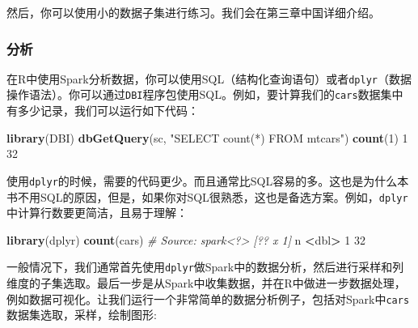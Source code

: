 \documentclass[
]{article}
\newenvironment{Shaded}{\begin{snugshade}}{\end{snugshade}}
\newcommand{\CommentTok}[1]{\textcolor[rgb]{0.56,0.35,0.01}{\textit{#1}}}
\newcommand{\DecValTok}[1]{\textcolor[rgb]{0.00,0.00,0.81}{#1}}
\newcommand{\KeywordTok}[1]{\textcolor[rgb]{0.13,0.29,0.53}{\textbf{#1}}}
\newcommand{\NormalTok}[1]{#1}
\newcommand{\OperatorTok}[1]{\textcolor[rgb]{0.81,0.36,0.00}{\textbf{#1}}}
\newcommand{\StringTok}[1]{\textcolor[rgb]{0.31,0.60,0.02}{#1}}
\begin{document}
然后，你可以使用小的数据子集进行练习。我们会在第三章中国详细介绍。

\hypertarget{ux5206ux6790}{%
\subsubsection{分析}\label{ux5206ux6790}}

在R中使用Spark分析数据，你可以使用SQL（结构化查询语句）或者\texttt{dplyr}（数据操作语法）。你可以通过\texttt{DBI}程序包使用SQL。例如，要计算我们的\texttt{cars}数据集中有多少记录，我们可以运行如下代码：

\begin{Shaded}
\begin{Highlighting}[]
\KeywordTok{library}\NormalTok{(DBI)}
\KeywordTok{dbGetQuery}\NormalTok{(sc, }\StringTok{"SELECT count(*) FROM mtcars"}\NormalTok{)}
\KeywordTok{count}\NormalTok{(}\DecValTok{1}\NormalTok{)}
\DecValTok{1} \DecValTok{32}
\end{Highlighting}
\end{Shaded}

使用\texttt{dplyr}的时候，需要的代码更少。而且通常比SQL容易的多。这也是为什么本书不用SQL的原因，但是，如果你对SQL很熟悉，这也是备选方案。例如，\texttt{dplyr}中计算行数要更简洁，且易于理解：

\begin{Shaded}
\begin{Highlighting}[]
\KeywordTok{library}\NormalTok{(dplyr)}
\KeywordTok{count}\NormalTok{(cars)}
\CommentTok{# Source: spark<?> [?? x 1]}
\NormalTok{n}
\OperatorTok{<}\NormalTok{dbl}\OperatorTok{>}
\DecValTok{1} \DecValTok{32}
\end{Highlighting}
\end{Shaded}

一般情况下，我们通常首先使用\texttt{dplyr}做Spark中的数据分析，然后进行采样和列维度的子集选取。最后一步是从Spark中收集数据，并在R中做进一步数据处理，例如数据可视化。让我们运行一个非常简单的数据分析例子，包括对Spark中\texttt{cars}数据集选取，采样，绘制图形:

\begin{Shaded}
\end{Shaded}
\end{document}
